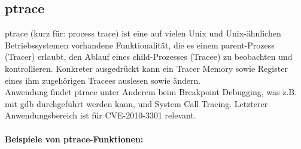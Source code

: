 \documentclass[11pt,a4paper]{article}
\begin{document}
\subsection{ptrace}
ptrace (kurz für: process trace) ist eine auf vielen Unix und Unix-ähnlichen Betriebssystemen vorhandene Funktionalität, die es einem parent-Prozess (Tracer) erlaubt, den Ablauf eines child-Prozesses (Tracee) zu beobachten und kontrollieren. Konkreter ausgedrückt kann ein Tracer Memory sowie Register eines ihm zugehörigen Tracees auslesen sowie ändern.\\
Anwendung findet ptrace unter Anderem beim Breakpoint Debugging, was z.B. mit gdb durchgeführt werden kann, und System Call Tracing. Letzterer Anwendungsbereich ist für CVE-2010-3301 relevant.\\
\\
\textbf{Beispiele von ptrace-Funktionen:}\\
\end{document}

